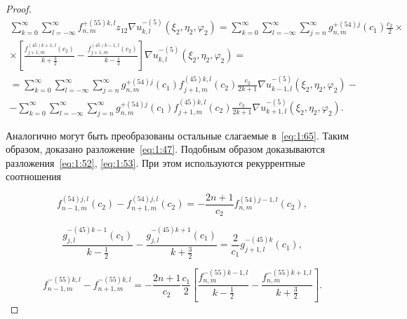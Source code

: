 \begin{russian}
\begin{proof}
\begin{multline}\label{eq:1:67}
\sum\limits_{k = 0}^\infty  {\sum\limits_{l =  - \infty }^\infty  {f_{n,m}^{ + (55)k,l}} } {z_{12}}\nabla u_{k,l}^{ - (5)}\left( {{\xi _2},{\eta _2},{\varphi _2}} \right) = \sum\limits_{k = 0}^\infty  \sum\limits_{l =  - \infty }^\infty  \sum\limits_{j = n}^\infty  {g_{n,m}^{ + (54)j}} ({c_1})\frac{{{c_2}}}{2}\times \\
\times \left[ {\frac{{f_{j + 1,m}^{(45)k + 1,l}({c_2})}}{{k + \frac{3}{2}}} - \frac{{f_{j + 1,m}^{(45)k - 1,l}({c_2})}}{{k - \frac{1}{2}}}} \right] \nabla u_{k,l}^{ - (5)}\left( {{\xi _2},{\eta _2},{\varphi _2}} \right) = \\
= \sum\limits_{k = 0}^\infty  {\sum\limits_{l =  - \infty }^\infty  {\sum\limits_{j = n}^\infty  {g_{n,m}^{ + (54)j}} } } ({c_1})f_{j + 1,m}^{(45)k,l}({c_2})\frac{{{c_2}}}{{2k + 1}}\nabla u_{k - 1,l}^{ - (5)}\left( {{\xi _2},{\eta _2},{\varphi _2}} \right) - \\
- \sum\limits_{k = 0}^\infty  {\sum\limits_{l =  - \infty }^\infty  {\sum\limits_{j = n}^\infty  {g_{n,m}^{ + (54)j}} } } ({c_1})f_{j + 1,m}^{(45)k,l}({c_2})\frac{{{c_2}}}{{2k + 1}}\nabla u_{k + 1,l}^{ - (5)}\left( {{\xi _2},{\eta _2},{\varphi _2}} \right).
\end{multline}

Аналогично могут быть преобразованы остальные слагаемые в~\eqref{eq:1:65}. Таким образом, доказано разложение~\eqref{eq:1:47}. Подобным образом доказываются разложения~\eqref{eq:1:52}, \eqref{eq:1:53}. При этом используются рекуррентные соотношения

\begin{equation}\label{eq:1:68}
f_{n - 1,m}^{(54)j,l}({c_2}) - f_{n + 1,m}^{(54)j,l}({c_2}) =  - \frac{{2n + 1}}{{{c_2}}}f_{n,m}^{(54)j - 1,l}({c_2}),
\end{equation}

\begin{equation}\label{eq:1:69}
\frac{{g_{j,l}^{ - (45)k - 1}({c_1})}}{{k - \frac{1}{2}}} - \frac{{g_{j,l}^{ - (45)k + 1}({c_1})}}{{k + \frac{3}{2}}} = \frac{2}{{{c_1}}}g_{j + 1,l}^{ - (45)k}({c_1}),
\end{equation}

\begin{equation}\label{eq:1:70}
f_{n - 1,m}^{ - (55)k,l} - f_{n + 1,m}^{ - (55)k,l} =  - \frac{{2n + 1}}{{{c_2}}}\frac{{{c_1}}}{2}\left[ {\frac{{f_{n,m}^{ - (55)k - 1,l}}}{{k - \frac{1}{2}}} - \frac{{f_{n,m}^{ - (55)k + 1,l}}}{{k + \frac{3}{2}}}} \right].
\end{equation}


\end{proof}
\end{russian}
